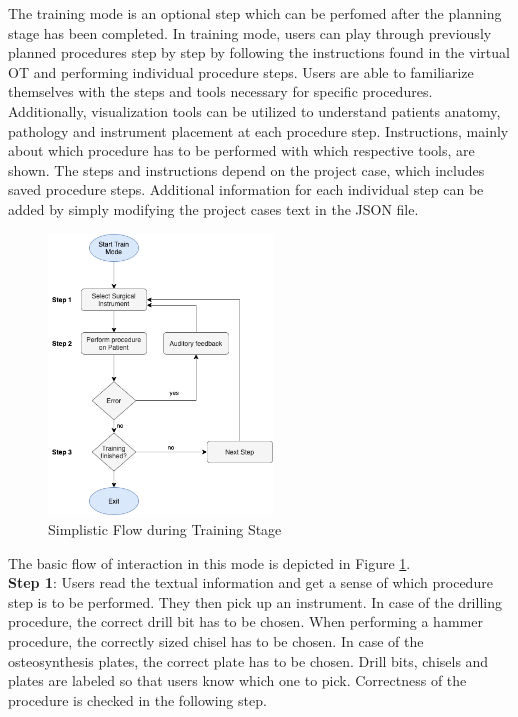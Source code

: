 The training mode is an optional step which can be perfomed after the planning stage has been completed.
In training mode, users can play through previously planned procedures step by step by following the instructions found in the virtual OT and performing individual procedure steps.
Users are able to familiarize themselves with the steps and tools necessary for specific procedures.
Additionally, visualization tools can be utilized to understand patients anatomy, pathology and instrument placement at each procedure step.
Instructions, mainly about which procedure has to be performed with which respective tools, are shown.
The steps and instructions depend on the project case, which includes saved procedure steps.
Additional information for each individual step can be added by simply modifying the project cases text in the JSON file.

\begin{figure}[ht]
    \centering
    \includegraphics[width=225px]{images/implementation/features/training/training_flow.png}
    \caption{\label{fig::TrainingFlow}Simplistic Flow during Training Stage}
\end{figure}

The basic flow of interaction in this mode is depicted in Figure \ref{fig::TrainingFlow}.
\\
\textbf{Step 1}: Users read the textual information and get a sense of which procedure step is to be performed.
They then pick up an instrument. In case of the drilling procedure, the correct drill bit has to be chosen.
When performing a hammer procedure, the correctly sized chisel has to be chosen.
In case of the osteosynthesis plates, the correct plate has to be chosen.
Drill bits, chisels and plates are labeled so that users know which one to pick.
Correctness of the procedure is checked in the following step.


